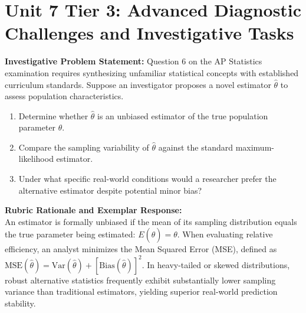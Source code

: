 \section{Unit 7 Tier 3: Advanced Diagnostic Challenges and Investigative Tasks}
\begin{frqrubricbox}
\textbf{Investigative Problem Statement:} Question 6 on the AP Statistics examination requires synthesizing unfamiliar statistical concepts with established curriculum standards. Suppose an investigator proposes a novel estimator $\hat{\theta}$ to assess population characteristics.
\begin{enumerate}[label=(\alph*)]
  \item Determine whether $\hat{\theta}$ is an unbiased estimator of the true population parameter $\theta$.
  \item Compare the sampling variability of $\hat{\theta}$ against the standard maximum-likelihood estimator.
  \item Under what specific real-world conditions would a researcher prefer the alternative estimator despite potential minor bias?
\end{enumerate}
\textbf{Rubric Rationale and Exemplar Response:}\\
An estimator is formally unbiased if the mean of its sampling distribution equals the true parameter being estimated: $E(\hat{\theta}) = \theta$. When evaluating relative efficiency, an analyst minimizes the Mean Squared Error (MSE), defined as $\text{MSE}(\hat{\theta}) = \text{Var}(\hat{\theta}) + [\text{Bias}(\hat{\theta})]^2$. In heavy-tailed or skewed distributions, robust alternative statistics frequently exhibit substantially lower sampling variance than traditional estimators, yielding superior real-world prediction stability.
\end{frqrubricbox}\vspace{6pt}
